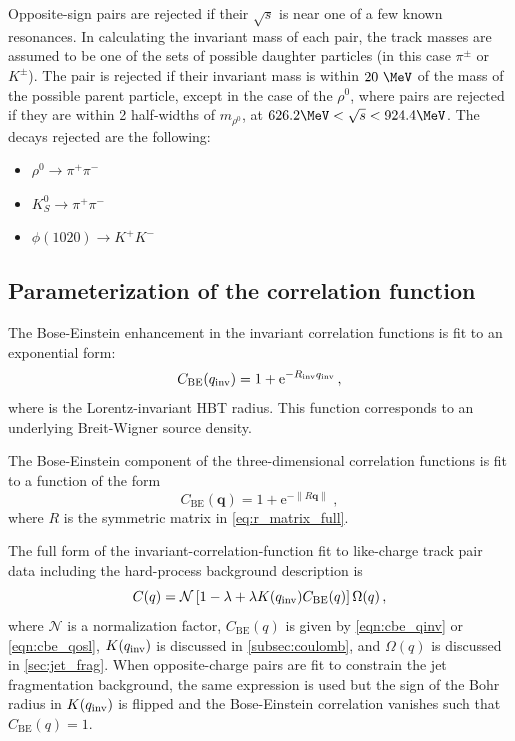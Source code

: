 Opposite-sign pairs are rejected if their $\sqrt{s}$ is near one of a few known resonances.
In calculating the invariant mass of each pair, the track masses are assumed to be one of the sets of possible daughter particles (in this case $\pi^{\pm}$ or $K^{\pm}$).
The pair is rejected if their invariant mass is within $20~\MeV$ of the mass of the possible parent particle, except in the case of the $\rho^{0}$, where pairs are rejected if they are within 2 half-widths of $m_{\rho^{0}}$, at $626.2 \MeV < \sqrt{s} < 924.4 \MeV$.
The decays rejected are the following:
\begin{itemize}
\item
  $\rho^{0} \rightarrow \pi^{+} \pi^{-}$
\item
  $K^{0}_{S} \rightarrow \pi^{+} \pi^{-}$
\item
  $\phi(1020) \rightarrow K^{+} K^{-}$
\end{itemize}


\subsection{Parameterization of the correlation function}

The Bose-Einstein enhancement in the invariant correlation functions is fit to an exponential form:
\begin{equation} C_{\textrm{BE}}(q_{\mathrm{inv}}) = 1 + \mathrm{e}^{- R_{\mathrm{inv}} q_{\mathrm{inv}} } \,, \label{eqn:cbe_qinv}\end{equation}
where \Rinv is the Lorentz-invariant HBT radius. This function corresponds to an underlying Breit-Wigner source density.

The Bose-Einstein component of the three-dimensional correlation functions is fit to a function of the form
\begin{equation}
C_{\textrm{BE}}(\mathbf{q}) = 1 + \mathrm{e}^{- \left\| R \mathbf{q} \right\|} \;, \label{eqn:cbe_qosl}
\end{equation}
where $R$ is the symmetric matrix in \cref{eq:r_matrix_full}.

The full form of the invariant-correlation-function fit to like-charge track pair data including the hard-process background description is
\begin{equation}
C(q) = \mathcal{N} \left[1-\lambda + \lambda K(q_{\mathrm{inv}})C_{\textrm{BE}}(q)\right] \Omega(q) \,,\label{eq:correlation_function_full}
\end{equation}
where $\mathcal{N}$ is a normalization factor, $C_\mathrm{BE}(q)$ is given by \cref{eqn:cbe_qinv} or \cref{eqn:cbe_qosl}, $K(q_{\mathrm{inv}})$ is discussed in \cref{subsec:coulomb}, and $\Omega(q)$ is discussed in \cref{sec:jet_frag}.
When opposite-charge pairs are fit to constrain the jet fragmentation background, the same expression is used but the sign of the Bohr radius in $K(q_{\mathrm{inv}})$ is flipped and the Bose-Einstein correlation vanishes such that $C_\mathrm{BE}(q) = 1$.

